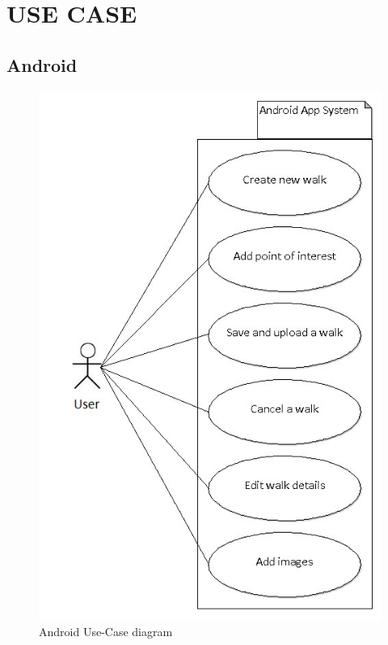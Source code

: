 \documentclass[12pt]{article}
\begin{document}
\section{USE CASE}
\subsection{Android}
\begin{figure}[htp]
\centering
\includegraphics[scale=0.60]{Project_Plan/docs/Android_use_case_final.jpg}
\caption{Android Use-Case diagram}
\label{Android Use-Case Diagram}
\end{figure}
\end{document}
